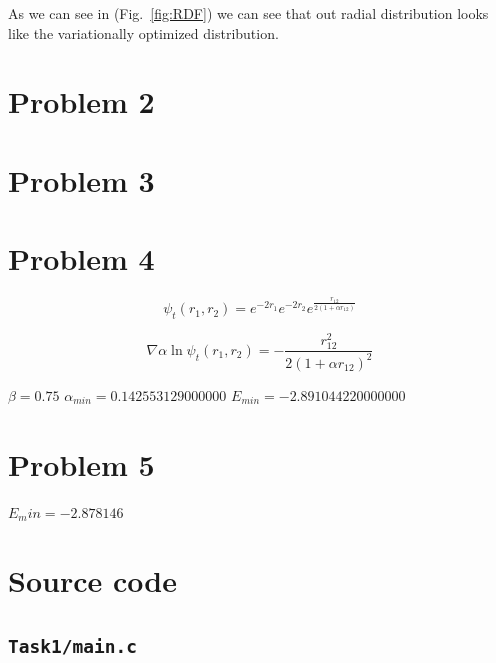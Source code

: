 As we can see in (Fig.~\ref{fig:RDF}) we can see that out radial distribution looks like the variationally optimized distribution.

\section*{Problem 2}

\section*{Problem 3}




\section*{Problem 4}

\begin{equation}
	\psi_t(r_1,r_2) = e^{-2r_1}e^{-2r_2}e^{\frac{r_{12}}{2(1+\alpha r_{12})}}
\end{equation}

\begin{equation}
	\nabla \alpha \ln{\psi_t(r_1,r_2)} = -\frac{r_{12}^2}{2(1+\alpha r_{12})^2}
\end{equation}

$\beta = 0.75$
$\alpha_{min}=0.142553129000000$
$E_{min}=-2.891044220000000$

\section*{Problem 5}

$E_min=-2.878146$


\appendix
\section{Source code}

\subsection{\texttt{Task1/main.c}}
%


